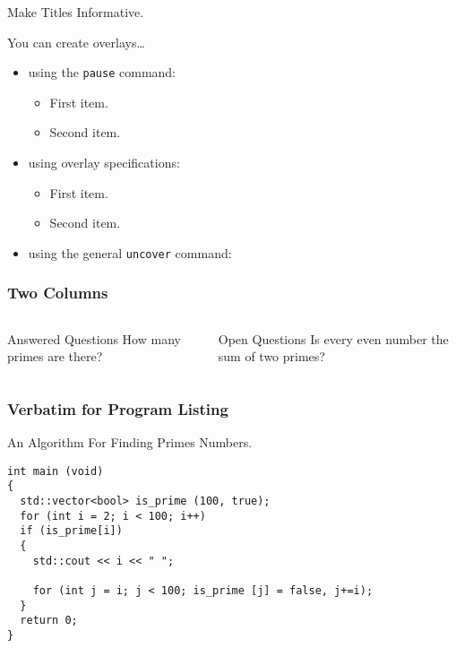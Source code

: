 \documentclass[t]{beamer}
\begin{document}
\begin{frame}{Make Titles Informative.}

  You can create overlays\dots
  \begin{itemize}
  \item using the \texttt{pause} command:
    \begin{itemize}
    \item
      First item.
      \pause
    \item
      Second item.
    \end{itemize}
  \item
    using overlay specifications:
    \begin{itemize}
    \item<3->
      First item.
    \item<4->
      Second item.
    \end{itemize}
  \item
    using the general \texttt{uncover} command:
    \begin{itemize}
    \end{itemize}
  \end{itemize}
\end{frame}

\begin{frame}[t]
  \frametitle{Two Columns}
  \begin{columns}
    \begin{block}{Answered Questions}
      How many primes are there?
    \end{block}
    \begin{block}{Open Questions}
      Is every even number the sum of two primes?
    \end{block}
  \end{columns}
\end{frame}

\begin{frame}[fragile]
\frametitle{Verbatim for Program Listing}
An Algorithm For Finding Primes Numbers.

\begin{verbatim}
int main (void)
{
  std::vector<bool> is_prime (100, true);
  for (int i = 2; i < 100; i++)
  if (is_prime[i])
  {
    std::cout << i << " ";

    for (int j = i; j < 100; is_prime [j] = false, j+=i);
  }
  return 0;
}
\end{verbatim}
\end{frame}
\end{document}

